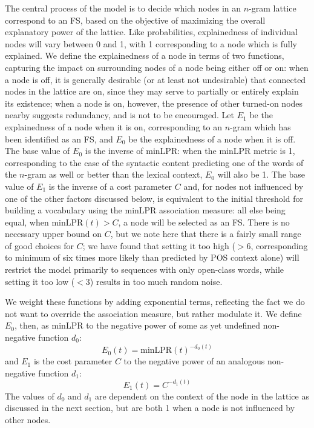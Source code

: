 \documentclass[11pt,letterpaper]{article}
\newcommand{\minLPR}{\ensuremath{\text{minLPR}}}
\begin{document}
The central process of the model is to decide which nodes in an $n$-gram lattice correspond to an FS, based on the objective of maximizing the overall explanatory power of the lattice. Like probabilities, explainedness of individual nodes will vary between 0 and 1, with 1 corresponding to a node which is fully explained. We define the explainedness of a node in terms of two functions, capturing the impact on surrounding nodes of a node being either off or on: when a node is off, it is generally desirable (or at least not undesirable) that connected nodes in the lattice are on, since they may serve to partially or entirely explain its existence; when a node is on, however, the presence of other turned-on nodes nearby suggests redundancy, and is not to be encouraged. Let $E_{1}$ be the explainedness of a node when it is on, corresponding to an $n$-gram which has been identified as an FS, and $E_{0}$ be the explainedness of a node when it is off. The base value of $E_{0}$ is the inverse of minLPR: when the minLPR metric is 1, corresponding to the case of the syntactic content predicting one of the words of the $n$-gram as well or better than the lexical context, $E_{0}$  will also be 1. The base value of $E_{1}$ is the inverse of a cost parameter $C$ and, for nodes not influenced by one of the other factors discussed below, is equivalent to the initial threshold for building a vocabulary using the minLPR association measure: all else being equal, when $\minLPR(t) > C$, a node will be selected as an FS. There is no necessary upper bound on $C$, but we note here that there is a fairly small range of good choices for $C$; we have found that setting it too high ($>6$, corresponding to minimum of six times more likely than predicted by POS context alone) will restrict the model primarily to sequences with only open-class words, while setting it too low ($<3$) results in too much random noise.


We weight these functions by adding exponential terms, reflecting the fact we do not want to override the association measure, but rather modulate it. We define $E_0$, then, as minLPR to the negative power of some as yet undefined non-negative function $d_0$:
\begin{displaymath}
E_0(t) = \minLPR(t)^{-d_0(t)}
\end{displaymath}
and $E_1$ is the cost parameter $C$ to the negative power of an analogous non-negative function $d_1$:
\begin{displaymath}
E_1(t) = C^{-d_1(t)}
\end{displaymath}
The values of $d_0$ and $d_1$ are dependent on the context of the node in the lattice as discussed in the next section, but are both 1 when a node is not influenced by other nodes.
\end{document}
